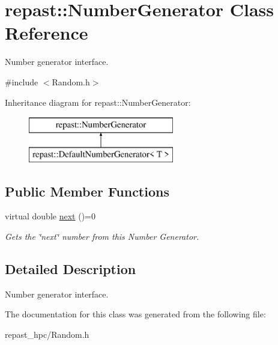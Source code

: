 \hypertarget{classrepast_1_1_number_generator}{\section{repast\-:\-:Number\-Generator Class Reference}
\label{classrepast_1_1_number_generator}
}


Number generator interface.  




{\ttfamily \#include $<$Random.\-h$>$}

Inheritance diagram for repast\-:\-:Number\-Generator\-:\begin{figure}[H]
\begin{center}
\leavevmode
\includegraphics[height=2.000000cm]{classrepast_1_1_number_generator}
\end{center}
\end{figure}
\subsection*{Public Member Functions}
\begin{DoxyCompactItemize}
\item 
\hypertarget{classrepast_1_1_number_generator_a98d94cf82a5283ff29d0df69b1b2f67c}{virtual double \hyperlink{classrepast_1_1_number_generator_a98d94cf82a5283ff29d0df69b1b2f67c}{next} ()=0}\label{classrepast_1_1_number_generator_a98d94cf82a5283ff29d0df69b1b2f67c}

\begin{DoxyCompactList}\small\item\em Gets the \char`\"{}next\char`\"{} number from this Number Generator. \end{DoxyCompactList}\end{DoxyCompactItemize}


\subsection{Detailed Description}
Number generator interface. 

The documentation for this class was generated from the following file\-:\begin{DoxyCompactItemize}
\item 
repast\-\_\-hpc/Random.\-h\end{DoxyCompactItemize}
